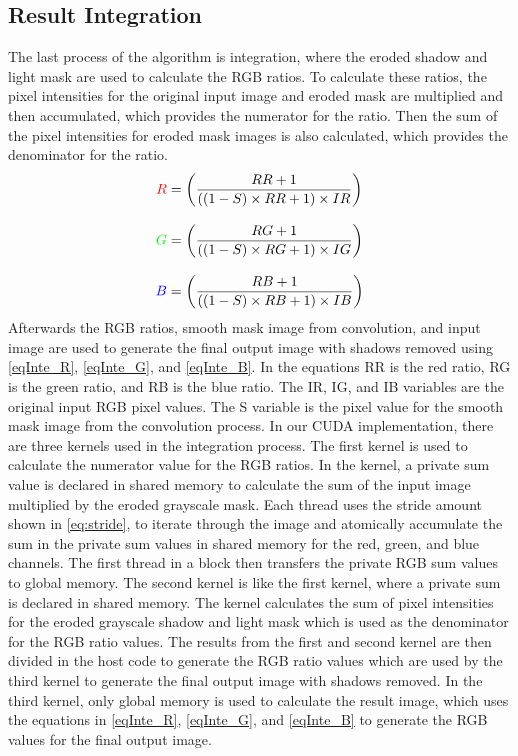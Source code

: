\documentclass[conference]{IEEEtran}
\begin{document}
      \subsection{Result Integration}
         The last process of the algorithm is integration, where the eroded shadow and light mask are used to calculate the RGB ratios. To calculate these ratios, the pixel intensities for the original input image and eroded mask are multiplied and then accumulated, which provides the numerator for the ratio. Then the sum of the pixel intensities for eroded mask images is also calculated, which provides the denominator for the ratio.
         \begin{subequations}\label{eqInte}
         	\begin{align}
         		\textcolor{red}{R}   & = \left(\frac{RR + 1}{((1 - S) \times RR + 1) \times IR}\right)\label{eqInte_R} \\[2ex]
         		\textcolor{green}{G} & = \left(\frac{RG + 1}{((1 - S) \times RG + 1) \times IG}\right)\label{eqInte_G} \\[2ex]
         		\textcolor{blue}{B}  & = \left(\frac{RB + 1}{((1 - S) \times RB + 1) \times IB}\right)\label{eqInte_B}
         	\end{align}
         \end{subequations}
         Afterwards the RGB ratios, smooth mask image from convolution, and input image are used to generate the final output image with shadows removed using \eqref{eqInte_R}, \eqref{eqInte_G}, and \eqref{eqInte_B}. In the equations RR is the red ratio, RG is the green ratio, and RB is the blue ratio. The IR, IG, and IB variables are the original input RGB pixel values. The S variable is the pixel value for the smooth mask image from the convolution process.
         In our CUDA implementation, there are three kernels used in the integration process. The first kernel is used to calculate the numerator value for the RGB ratios. In the kernel, a private sum value is declared in shared memory to calculate the sum of the input image multiplied by the eroded grayscale mask. Each thread uses the stride amount shown in \eqref{eq:stride}, to iterate through the image and atomically accumulate the sum in the private sum values in shared memory for the red, green, and blue channels. The first thread in a block then transfers the private RGB sum values to global memory.
         The second kernel is like the first kernel, where a private sum is declared in shared memory. The kernel calculates the sum of pixel intensities for the eroded grayscale shadow and light mask which is used as the denominator for the RGB ratio values.
         The results from the first and second kernel are then divided in the host code to generate the RGB ratio values which are used by the third kernel to generate the final output image with shadows removed.
         In the third kernel, only global memory is used to calculate the result image, which uses the equations in \eqref{eqInte_R}, \eqref{eqInte_G}, and \eqref{eqInte_B} to generate the RGB values for the final output image.
\end{document}
